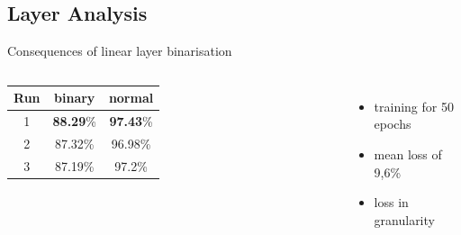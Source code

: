 \documentclass[aspectratio=1610, 12pt]{beamer}
\begin{document}
\subsection{Layer Analysis}
\begin{frame}{Consequences of linear layer binarisation}


\begin{columns}
	\centering
	\begin{tabular}{|c|c|c|}\hline
		Run&binary&normal\\\hline
		1&\textbf{88.29}\%&\textbf{97.43}\%\\\hline
		2&87.32\%&96.98\%\\\hline
		3&87.19\%&97.2\%\\\hline
	\end{tabular}	
	\begin{itemize}
		\item training for 50 epochs
		\item mean loss of 9,6\%
		\item loss in granularity
	\end{itemize}
	
\end{columns}


\end{frame}
\end{document}
